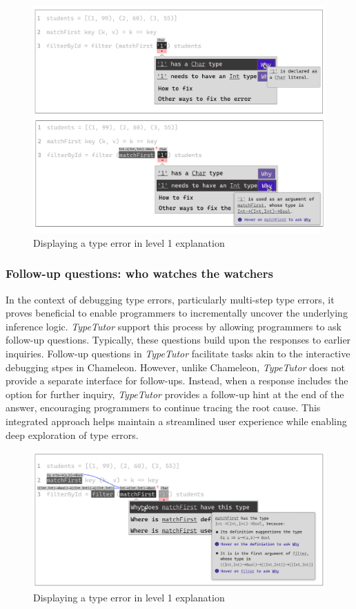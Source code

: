 \begin{figure}[hbt]
  \includegraphics[width=\linewidth]{Why}
  \caption{
      Displaying a type error in level 1 explanation
    }
\end{figure}



\subsubsection{Follow-up questions: who watches the watchers}


In the context of debugging type errors, particularly multi-step type errors, it proves beneficial to enable programmers to incrementally uncover the underlying inference logic. \textit{TypeTutor} support this process by allowing programmers to ask follow-up questions. Typically, these questions build upon the responses to earlier inquiries. Follow-up questions in \textit{TypeTutor} facilitate tasks akin to the interactive debugging stpes in Chameleon. However, unlike Chameleon, \textit{TypeTutor} does not provide a separate interface for follow-ups. Instead, when a response includes the option for further inquiry, \textit{TypeTutor} provides a follow-up hint at the end of the answer, encouraging programmers to continue tracing the root cause. This integrated approach helps maintain a streamlined user experience while enabling deep exploration of type errors.


\begin{figure}[hbt]
  \includegraphics[width=\linewidth]{FollowUp}
  \caption{
      Displaying a type error in level 1 explanation
    }
\end{figure}
